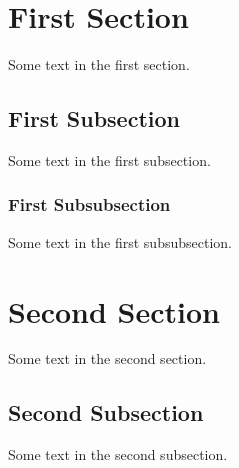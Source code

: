 \documentclass{ui1activity}
\begin{document}
\tableofcontents
\section{First Section}
Some text in the first section.
\subsection{First Subsection}
Some text in the first subsection.
\subsubsection{First Subsubsection}
Some text in the first subsubsection.
\section{Second Section}
Some text in the second section.
\subsection{Second Subsection}
Some text in the second subsection.
\end{document}
